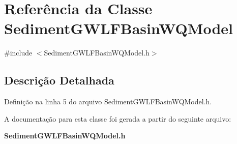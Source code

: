 \section{Referência da Classe Sediment\+G\+W\+L\+F\+Basin\+W\+Q\+Model}
\label{class_sediment_g_w_l_f_basin_w_q_model}


{\ttfamily \#include $<$Sediment\+G\+W\+L\+F\+Basin\+W\+Q\+Model.\+h$>$}



\subsection{Descrição Detalhada}


Definição na linha 5 do arquivo Sediment\+G\+W\+L\+F\+Basin\+W\+Q\+Model.\+h.



A documentação para esta classe foi gerada a partir do seguinte arquivo\+:\begin{DoxyCompactItemize}
\item 
{\bf Sediment\+G\+W\+L\+F\+Basin\+W\+Q\+Model.\+h}\end{DoxyCompactItemize}
